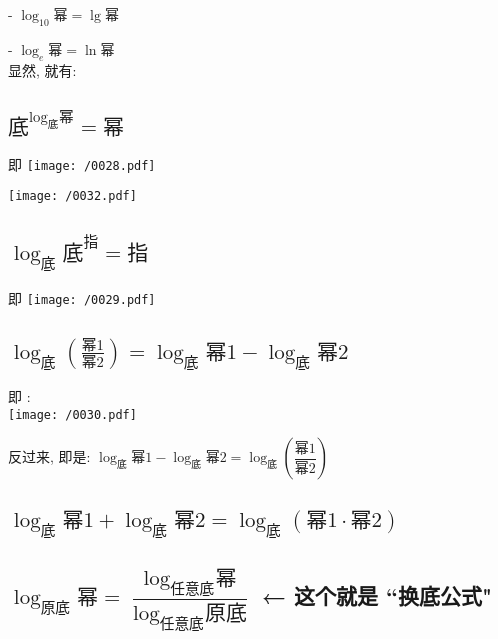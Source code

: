 \documentclass[UTF8]{ctexart}
\begin{document}
- $\log _{10}\text{幂}=\lg\text{幂}$

- $\log _e\text{幂}=\ln\text{幂}$ \\

显然, 就有:


\subsection{$\text{底}^{\log _{\text{底}}\text{幂}}=\text{幂}$}

即 
\texttt{[image: /0028.pdf]} \\


\begin{myEnvSample}
\texttt{[image: /0032.pdf]}
\end{myEnvSample}


\dotfill


\subsection{$\log _{\text{底}}\text{底}^{\text{指}}=\text{指}$}

即 
\texttt{[image: /0029.pdf]}


\dotfill



\subsection{$\log _{\text{底}}\left( \frac{\text{幂}1}{\text{幂}2} \right) =\log _{\text{底}}\text{幂}1-\log _{\text{底}}\text{幂}2$}

即 : \\
\texttt{[image: /0030.pdf]}


反过来, 即是:  $\log _{\text{底}}\text{幂}1-\log _{\text{底}}\text{幂}2=\log _{\text{底}}\left( \dfrac{\text{幂}1}{\text{幂}2} \right) $


\dotfill


\subsection{$\log _{\text{底}}\text{幂}1+\log _{\text{底}}\text{幂}2=\log _{\text{底}}\left( \text{幂}1\cdot \text{幂}2 \right) $}





\dotfill

\subsection{$\log _{\text{原底}}\text{幂}=\dfrac{\log _{\text{任意底}}\text{幂}}{\log _{\text{任意底}}\text{原底}}$ ← 这个就是 ``换底公式"}
\end{document}
